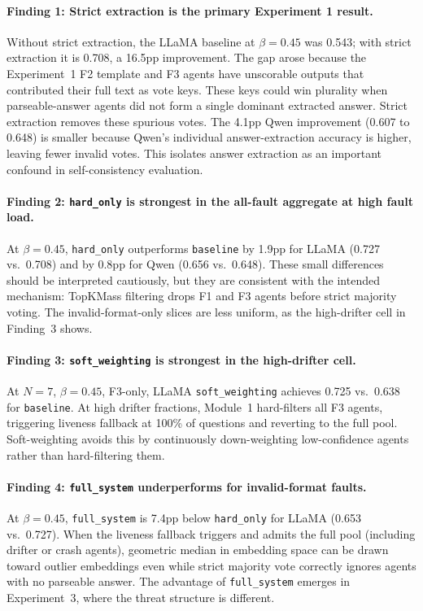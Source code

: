 \documentclass[11pt]{article}
\begin{document}
\paragraph{Finding 1: Strict extraction is the primary Experiment 1 result.}
Without strict extraction, the LLaMA baseline at $\beta=0.45$ was 0.543; with
strict extraction it is 0.708, a 16.5pp improvement. The gap arose because the
Experiment~1 F2 template and F3 agents have unscorable outputs that contributed
their full text as vote keys. These keys could win plurality when
parseable-answer agents did not form a single
dominant extracted answer. Strict extraction removes these spurious votes. The
4.1pp Qwen improvement (0.607 to 0.648) is smaller because Qwen's individual
answer-extraction accuracy is higher, leaving fewer invalid votes. This isolates
answer extraction as an important confound in self-consistency evaluation.

\paragraph{Finding 2: \texttt{hard\_only} is strongest in the all-fault aggregate
at high fault load.}
At $\beta=0.45$, \texttt{hard\_only} outperforms \texttt{baseline} by 1.9pp for
LLaMA (0.727 vs.\ 0.708) and by 0.8pp for Qwen (0.656 vs.\ 0.648). These small
differences should be interpreted cautiously, but they are consistent with the
intended mechanism: TopKMass filtering drops F1 and F3 agents before strict
majority voting. The invalid-format-only slices are less uniform, as the
high-drifter cell in Finding~3 shows.

\paragraph{Finding 3: \texttt{soft\_weighting} is strongest in the high-drifter
cell.}
At $N=7$, $\beta=0.45$, F3-only, LLaMA \texttt{soft\_weighting} achieves 0.725
vs.\ 0.638 for \texttt{baseline}. At high drifter fractions, Module~1
hard-filters all F3 agents, triggering liveness fallback at 100\% of questions
and reverting to the full pool. Soft-weighting avoids this by continuously
down-weighting low-confidence agents rather than hard-filtering them.

\paragraph{Finding 4: \texttt{full\_system} underperforms for invalid-format
faults.}
At $\beta=0.45$, \texttt{full\_system} is 7.4pp below \texttt{hard\_only} for
LLaMA (0.653 vs.\ 0.727). When the liveness fallback triggers and admits the
full pool (including drifter or crash agents), geometric median in embedding
space can be drawn toward outlier embeddings even while strict majority vote
correctly ignores agents with no parseable answer. The advantage of
\texttt{full\_system} emerges in Experiment~3, where the threat structure is
different.
\end{document}
